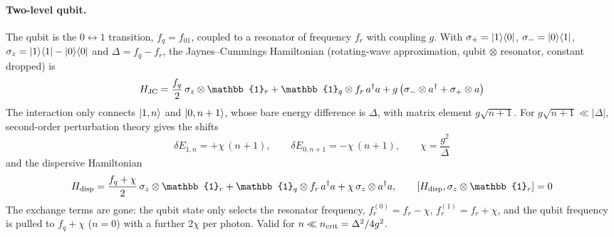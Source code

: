\documentclass[11pt]{article}
\newcommand{\ad}{a^{\dagger}}
\newcommand{\id}{\mathbb{1}}
\begin{document}
\paragraph{Two-level qubit.}
The qubit is the $0\leftrightarrow1$ transition, $f_q = f_{01}$, coupled to a resonator of
frequency $f_r$ with coupling $g$. With $\sigma_+ = \ket{1}\!\bra{0}$, $\sigma_- = \ket{0}\!\bra{1}$,
$\sigma_z = \ket{1}\!\bra{1} - \ket{0}\!\bra{0}$ and $\Delta = f_q - f_r$, the Jaynes--Cummings
Hamiltonian (rotating-wave approximation, qubit $\otimes$ resonator, constant dropped) is
\begin{equation}
  H_{\rm JC} = \frac{f_q}{2}\,\sigma_z \otimes \id_r + \id_q \otimes f_r\,\ad a
     + g\,\big(\sigma_- \otimes \ad + \sigma_+ \otimes a\big)
\end{equation}
The interaction only connects $\ket{1,n}$ and $\ket{0,n+1}$, whose bare energy difference is
$\Delta$, with matrix element $g\sqrt{n+1}$. For $g\sqrt{n+1}\ll|\Delta|$, second-order
perturbation theory gives the shifts
\begin{equation}
  \delta E_{1,n} = +\chi\,(n+1), \qquad \delta E_{0,n+1} = -\chi\,(n+1), \qquad
  \chi = \frac{g^2}{\Delta}
\end{equation}
and the dispersive Hamiltonian
\begin{equation}
  H_{\rm disp} = \frac{f_q + \chi}{2}\,\sigma_z\otimes\id_r
     + \id_q\otimes f_r\,\ad a + \chi\,\sigma_z\otimes\ad a,
  \qquad [H_{\rm disp}, \sigma_z\otimes\id_r] = 0
\end{equation}
The exchange terms are gone: the qubit state only selects the resonator frequency,
$f_r^{(0)} = f_r - \chi$, $f_r^{(1)} = f_r + \chi$, and the qubit frequency is pulled to
$f_q + \chi$ ($n = 0$) with a further $2\chi$ per photon. Valid for $n \ll n_{\rm crit}
= \Delta^2/4g^2$.
\end{document}
